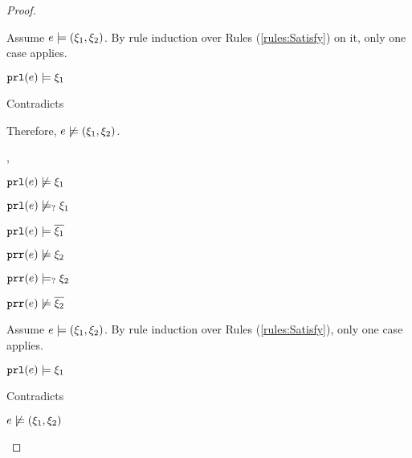 \begin{proof}
\begin{byCases}
\begin{byCases}
\begin{byCases}
            Assume $e \models (\xi_1 , \xi_2)$. By rule induction over Rules (\ref{rules:Satisfy}) on it, only one case applies.
            \begin{byCases}
            \item[\text{(\ref{rule:CSNotValPair})}]
                \begin{pfsteps*}
                \item $\mathtt{prl}(e) \models \xi_1$ 
                \end{pfsteps*}
                Contradicts 
            \end{byCases}
            Therefore, $e \not\models (\xi_1 , \xi_2)$.
        \item[\csatisfy{\hprl{e}}{\cdual{\xi_1}},\cmaysatisfy{\hprr{e}}{\xi_2}]
            \begin{pfsteps*}
            \item $\mathtt{prl}(e) \not\models \xi_1$  
            \item $\mathtt{prl}(e) \not\models_{?} \xi_1$  
            \item $\mathtt{prl}(e) \models \overline{\xi_1}$  
            \item $\mathtt{prr}(e) \not\models \xi_2$  
            \item $\mathtt{prr}(e) \models_{?} \xi_2$  
            \item $\mathtt{prr}(e) \not\models \overline{\xi_2}$  
            \end{pfsteps*}
            Assume $e \models (\xi_1 , \xi_2)$. By rule induction over Rules (\ref{rules:Satisfy}), only one case applies.
            \begin{byCases}
            \item[\text{(\ref{rule:CSNotValPair})}]
                \begin{pfsteps*}
                \item $\mathtt{prl}(e) \models \xi_1$ 
                \end{pfsteps*}
                Contradicts 
            \end{byCases}
            \begin{pfsteps*}
            \item $e \not\models (\xi_1 , \xi_2)$  

\end{pfsteps*}
\end{byCases}
\end{byCases}
\end{byCases}
\end{proof}
